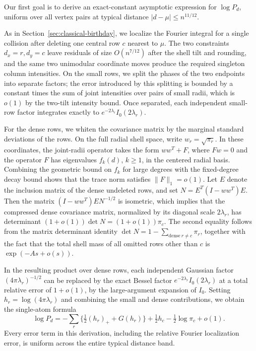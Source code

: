 Our first goal is to derive an exact-constant asymptotic expression for \(\log P_d\), uniform over all vertex pairs at typical distance \(|d-\mu|\le n^{11/12}\).

As in Section~\ref{sec:classical-birthday}, we localize the Fourier integral for a single collision after deleting one central row \(c\) nearest to \(\mu\). The two constraints \(d_x=r,d_y=c\) leave residuals of size \(O(n^{7/12})\) after the shell tilt and rounding, and the same two unimodular coordinate moves produce the required singleton column intensities. On the small rows, we split the phases of the two endpoints into separate factors; the error introduced by this splitting is bounded by a constant times the sum of joint intensities over pairs of small radii, which is \(o(1)\) by the two-tilt intensity bound. Once separated, each independent small-row factor integrates exactly to \(e^{-2\lambda_r}I_0(2\lambda_r)\).

For the dense rows, we whiten the covariance matrix by the marginal standard deviations of the rows. On the full radial shell space, write \(w_r=\sqrt{\pi_r}\). In these coordinates, the joint-radii operator takes the form \(ww^T+F\), where \(Fw=0\) and the operator \(F\) has eigenvalues \(f_k(d)\), \(k\ge1\), in the centered radial basis. Combining the geometric bound on \(f_k\) for large degrees with the fixed-degree decay bound shows that the trace norm satisfies \(\|F\|_1=o(1)\). Let \(E\) denote the inclusion matrix of the dense undeleted rows, and set \(N=E^T(I-ww^T)E\). Then the matrix \((I-ww^T)EN^{-1/2}\) is isometric, which implies that the compressed dense covariance matrix, normalized by its diagonal scale \(2\lambda_r\), has determinant \((1+o(1))\det N=(1+o(1))\pi_c\). The second equality follows from the matrix determinant identity \(\det N=1-\sum_{\mathrm{dense}\ r\ne c}\pi_r\), together with the fact that the total shell mass of all omitted rows other than \(c\) is \(\exp(-As+o(s))\).

In the resulting product over dense rows, each independent Gaussian factor \((4\pi\lambda_r)^{-1/2}\) can be replaced by the exact Bessel factor \(e^{-2\lambda_r}I_0(2\lambda_r)\) at a total relative error of \(1+o(1)\), by the large-argument expansion of \(I_0\). Setting \(h_r=\log(4\pi\lambda_r)\) and combining the small and dense contributions, we obtain the single-atom formula
\[
 \log P_d=
 -\sum_r\{\tfrac12(h_r)_++G(h_r)\}
 +\tfrac12 h_c-\tfrac12\log\pi_c+o(1).                 \tag{*}
\]
Every error term in this derivation, including the relative Fourier localization error, is uniform across the entire typical distance band.

